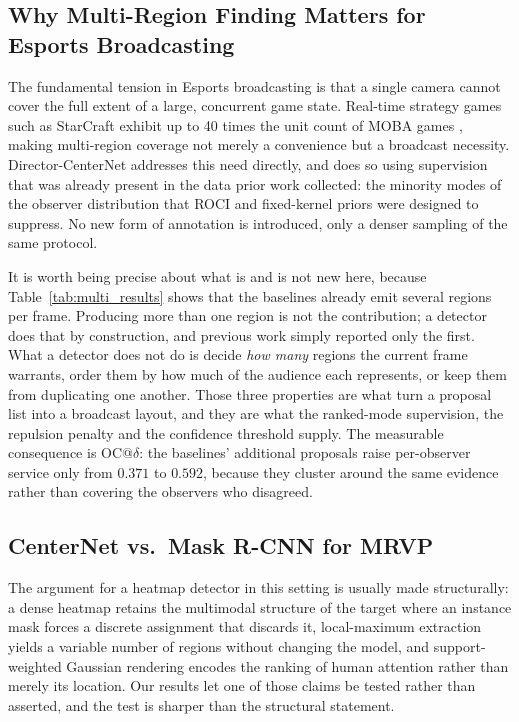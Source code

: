 \documentclass[preprint,12pt]{elsarticle}
\begin{document}
\subsection{Why Multi-Region Finding Matters for Esports Broadcasting}

The fundamental tension in Esports broadcasting is that a single camera 
cannot cover the full extent of a large, concurrent game state. Real-time 
strategy games such as StarCraft exhibit up to 40 times the unit count of 
MOBA games \cite{joo2023learning}, making multi-region coverage not merely 
a convenience but a broadcast necessity. Director-CenterNet addresses this
need directly, and does so using supervision that was already present in the
data prior work collected: the minority modes of the observer distribution
that ROCI and fixed-kernel priors were designed to suppress. No new form of
annotation is introduced, only a denser sampling of the same protocol.

It is worth being precise about what is and is not new here, because
Table~\ref{tab:multi_results} shows that the baselines already emit several
regions per frame. Producing more than one region is not the contribution; a
detector does that by construction, and previous work simply reported only the
first. What a detector does not do is decide \emph{how many} regions the
current frame warrants, order them by how much of the audience each represents,
or keep them from duplicating one another. Those three properties are what turn
a proposal list into a broadcast layout, and they are what the ranked-mode
supervision, the repulsion penalty and the confidence threshold supply. The
measurable consequence is OC@$\delta$: the baselines' additional proposals
raise per-observer service only from $0.371$ to $0.592$, because they cluster
around the same evidence rather than covering the observers who disagreed.

\subsection{CenterNet vs.\ Mask R-CNN for MRVP}

The argument for a heatmap detector in this setting is usually made
structurally: a dense heatmap retains the multimodal structure of the target
where an instance mask forces a discrete assignment that discards it,
local-maximum extraction yields a variable number of regions without changing
the model, and support-weighted Gaussian rendering encodes the ranking of human
attention rather than merely its location. Our results let one of those claims
be tested rather than asserted, and the test is sharper than the structural
statement.
\end{document}
